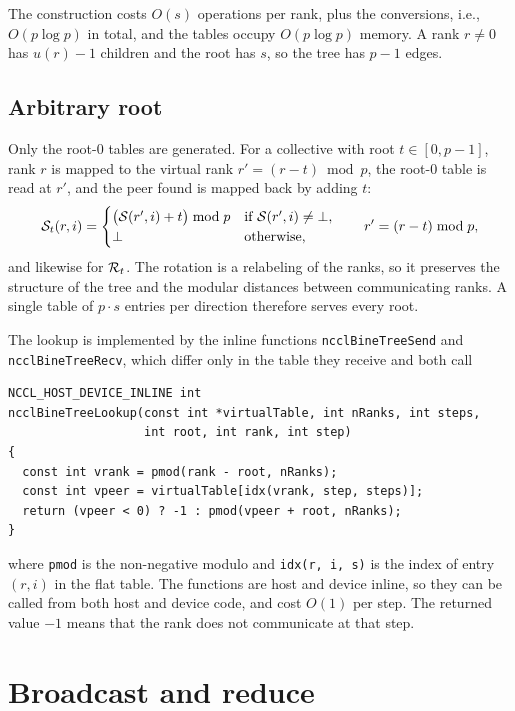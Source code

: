 The construction costs $O(s)$ operations per rank, plus the conversions, i.e., $O(p\log p)$ in total, and the tables occupy $O(p\log p)$ memory.
A rank $r\neq0$ has $u(r)-1$ children and the root has $s$, so the tree has $p-1$ edges.

\subsection{Arbitrary root}\label{sec:tree-root}

Only the root-$0$ tables are generated.
For a collective with root $t\in[0,p-1]$, rank $r$ is mapped to the virtual rank $r'=(r-t)\bmod p$, the root-$0$ table is read at $r'$, and the peer found is mapped back by adding $t$:
\begin{equation}
  \mathcal{S}_t(r,i) =
  \begin{cases}
    \bigl(\mathcal{S}(r',i)+t\bigr)\bmod p & \text{if } \mathcal{S}(r',i)\neq\bot,\\
    \bot & \text{otherwise,}
  \end{cases}
  \qquad r'=(r-t)\bmod p,
  \label{eq:rotation}
\end{equation}
and likewise for $\mathcal{R}_t$.
The rotation is a relabeling of the ranks, so it preserves the structure of the tree and the modular distances between communicating ranks.
A single table of $p\cdot s$ entries per direction therefore serves every root.

The lookup is implemented by the inline functions \texttt{ncclBineTreeSend} and \texttt{ncclBineTreeRecv}, which differ only in the table they receive and both call
\begin{verbatim}
NCCL_HOST_DEVICE_INLINE int
ncclBineTreeLookup(const int *virtualTable, int nRanks, int steps,
                   int root, int rank, int step)
{
  const int vrank = pmod(rank - root, nRanks);
  const int vpeer = virtualTable[idx(vrank, step, steps)];
  return (vpeer < 0) ? -1 : pmod(vpeer + root, nRanks);
}
\end{verbatim}
where \texttt{pmod} is the non-negative modulo and \texttt{idx(r, i, s)} is the index of entry $(r,i)$ in the flat table.
The functions are host and device inline, so they can be called from both host and device code, and cost $O(1)$ per step.
The returned value $-1$ means that the rank does not communicate at that step.

\section{Broadcast and reduce}\label{sec:tree-collectives}\label{sec:tree-bcast}\label{sec:tree-reduce}

